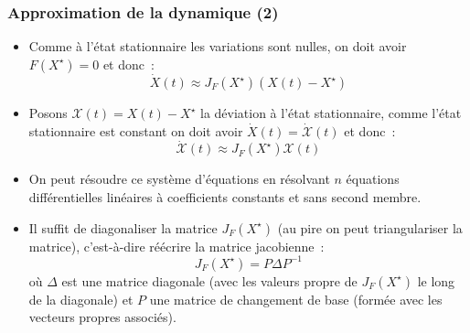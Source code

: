 \documentclass[10pt,notheorems]{beamer}
\theoremstyle{plain}
\theoremstyle{definition} %
\begin{document}
\begin{frame}
  \frametitle{Approximation de la dynamique (2)}

  \begin{itemize}

  \item Comme à l'état stationnaire les variations sont nulles, on doit avoir $F(X^\star)=0$ et donc~:
    \[
      \dot X(t) \approx J_F(X^\star)(X(t)-X^\star)
    \]

    \medskip

  \item Posons $\mathcal X(t) = X(t)-X^\star$ la déviation à l'état stationnaire, comme l'état stationnaire est constant on doit avoir $\dot X(t) = \dot{\mathcal X}(t)$ et donc~:
    \[
      \dot{\mathcal X}(t) \approx J_F(X^\star)\mathcal X(t)
    \]

    \medskip

  \item On peut résoudre ce système d'équations en résolvant $n$ équations différentielles linéaires à coefficients constants et sans second membre.\newline

  \item Il suffit de diagonaliser la matrice $J_F(X^\star)$ (au pire on peut triangulariser la matrice), c'est-à-dire réécrire la matrice jacobienne~:
    \[
      J_F(X^\star) = P \Delta P^{-1}
    \]
    où $\Delta$ est une matrice diagonale (avec les valeurs propre de $J_F(X^\star)$ le long de la diagonale) et $P$ une matrice de changement de base (formée avec les vecteurs propres associés).

  \end{itemize}
\end{frame}
\end{document}
